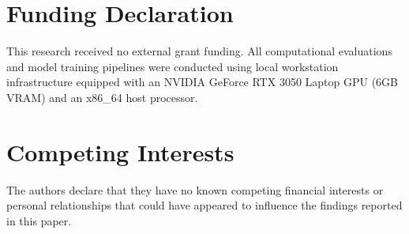 \documentclass[journal,10pt,onecolumn]{IEEEtran}
\begin{document}
\section*{Funding Declaration}
This research received no external grant funding. All computational evaluations and model training pipelines were conducted using local workstation infrastructure equipped with an NVIDIA GeForce RTX 3050 Laptop GPU (6GB VRAM) and an x86\_64 host processor.

\section*{Competing Interests}
The authors declare that they have no known competing financial interests or personal relationships that could have appeared to influence the findings reported in this paper.
\end{document}
